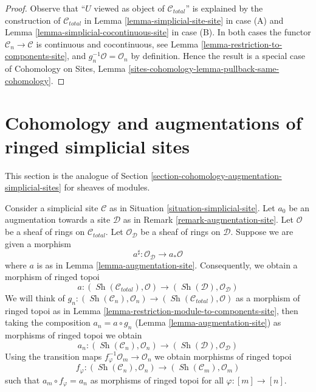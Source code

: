 \documentclass{stacks-project}
\theoremstyle{plain}
\theoremstyle{definition}
\theoremstyle{remark}
\numberwithin{equation}{subsection}
\def\Sh{\mathop{\mathit{Sh}}\nolimits}
\begin{document}
\begin{proof}
Observe that ``$U$ viewed as object of $\mathcal{C}_{total}$''
is explained by the construction of $\mathcal{C}_{total}$ in
Lemma \ref{lemma-simplicial-site-site} in case (A) and
Lemma \ref{lemma-simplicial-cocontinuous-site} in case (B).
In both cases the functor $\mathcal{C}_n \to \mathcal{C}$
is continuous and cocontinuous, see
Lemma \ref{lemma-restriction-to-components-site}, and
$g_n^{-1}\mathcal{O} = \mathcal{O}_n$ by definition.
Hence the result is a special case of
Cohomology on Sites, Lemma
\ref{sites-cohomology-lemma-pullback-same-cohomology}.
\end{proof}






\section{Cohomology and augmentations of ringed simplicial sites}
\label{section-cohomology-augmentation-ringed-simplicial-sites}

\noindent
This section is the analogue of
Section \ref{section-cohomology-augmentation-simplicial-sites}
for sheaves of modules.

\medskip\noindent
Consider a simplicial site $\mathcal{C}$ as in
Situation \ref{situation-simplicial-site}.
Let $a_0$ be an augmentation towards a site $\mathcal{D}$ as in
Remark \ref{remark-augmentation-site}.
Let $\mathcal{O}$ be a sheaf of rings on $\mathcal{C}_{total}$.
Let $\mathcal{O}_\mathcal{D}$ be a sheaf of rings on $\mathcal{D}$.
Suppose we are given a morphism
$$
a^\sharp : \mathcal{O}_\mathcal{D} \longrightarrow a_*\mathcal{O}
$$
where $a$ is as in Lemma \ref{lemma-augmentation-site}.
Consequently, we obtain a morphism of ringed topoi
$$
a :
(\Sh(\mathcal{C}_{total}), \mathcal{O})
\longrightarrow
(\Sh(\mathcal{D}), \mathcal{O}_\mathcal{D})
$$
We will think of $g_n : (\Sh(\mathcal{C}_n), \mathcal{O}_n) \to
(\Sh(\mathcal{C}_{total}), \mathcal{O})$ as a morphism of ringed topoi
as in
Lemma \ref{lemma-restriction-module-to-components-site}, then
taking the composition $a_n = a \circ g_n$
(Lemma \ref{lemma-augmentation-site})
as morphisms of ringed topoi we obtain
$$
a_n :
(\Sh(\mathcal{C}_n), \mathcal{O}_n)
\longrightarrow
(\Sh(\mathcal{D}), \mathcal{O}_\mathcal{D})
$$
Using the transition maps $f_\varphi^{-1}\mathcal{O}_m \to \mathcal{O}_n$
we obtain morphisms of ringed topoi
$$
f_\varphi : (\Sh(\mathcal{C}_n), \mathcal{O}_n) \to
(\Sh(\mathcal{C}_m), \mathcal{O}_m)
$$
such that $a_m \circ f_\varphi = a_n$ as morphisms of
ringed topoi for all $\varphi : [m] \to [n]$.
\end{document}
